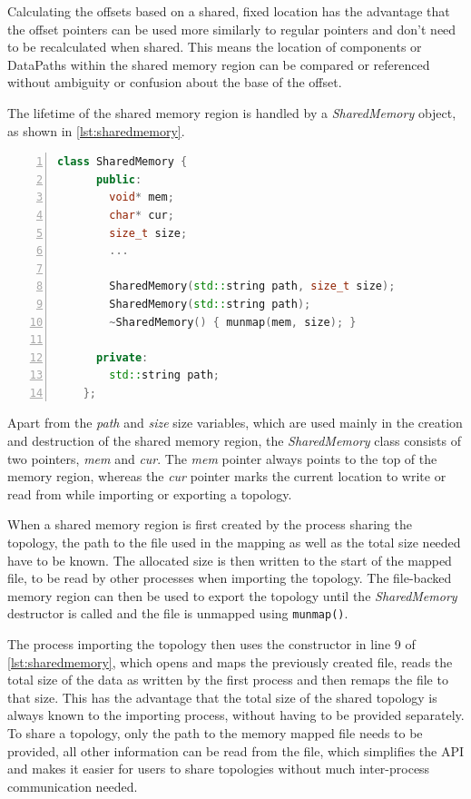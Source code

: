 Calculating the offsets based on a shared, fixed location has the advantage that the offset pointers can be used more similarly to regular pointers and don't need to be recalculated when shared.
This means the location of components or DataPaths within the shared memory region can be compared or referenced without ambiguity or confusion about the base of the offset.

The lifetime of the shared memory region is handled by a \emph{SharedMemory} object, as shown in \autoref{lst:sharedmemory}.

\begin{lstlisting}[language=c++, numbers=left, caption=SharedMemory Class, captionpos=b, label={lst:sharedmemory}]
    class SharedMemory {
      public:
        void* mem;
        char* cur;
        size_t size;
        ...

        SharedMemory(std::string path, size_t size);
        SharedMemory(std::string path);
        ~SharedMemory() { munmap(mem, size); }

      private:
        std::string path;
    };
\end{lstlisting}

Apart from the \emph{path} and \emph{size} size variables, which are used mainly in the creation and destruction of the shared memory region,
the \emph{SharedMemory} class consists of two pointers, \emph{mem} and \emph{cur}.
The \emph{mem} pointer always points to the top of the memory region, whereas the \emph{cur} pointer marks the current location to write or read from while importing or exporting a topology.

When a shared memory region is first created by the process sharing the topology, the path to the file used in the mapping as well as the total size needed have to be known.
The allocated size is then written to the start of the mapped file, to be read by other processes when importing the topology.
The file-backed memory region can then be used to export the topology until the \emph{SharedMemory} destructor is called and the file is unmapped using \lstinline{munmap()}.

The process importing the topology then uses the constructor in line 9 of \autoref{lst:sharedmemory}, which opens and maps the previously created file,
reads the total size of the data as written by the first process and then remaps the file to that size.
This has the advantage that the total size of the shared topology is always known to the importing process, without having to be provided separately.
To share a topology, only the path to the memory mapped file needs to be provided, all other information can be read from the file, which simplifies the API and makes it easier
for users to share topologies without much inter-process communication needed.

